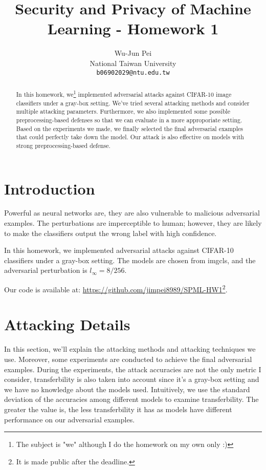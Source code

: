 \documentclass{article}
\title{Security and Privacy of Machine Learning - Homework 1}
\author{
  Wu-Jun Pei\\
  National Taiwan University\\
  \texttt{b06902029@ntu.edu.tw} \\
}
\begin{document}
\maketitle

\begin{abstract}
  In this homework, we\footnote{The subject is "we" although I do the homework on my own only :)} implemented adversarial attacks against CIFAR-10 image classifiers under a gray-box setting. We've tried several attacking methods and consider multiple attacking parameters. Furthermore, we also implemented some possible preprocessing-based defenses so that we can evaluate in a more approporiate setting. Based on the experiments we made, we finally selected the final adversarial examples that could perfectly take down the model. Our attack is also effective on models with strong preprocessing-based defense.
\end{abstract}

\section{Introduction}
Powerful as neural networks are, they are also vulnerable to malicious adversarial examples. The perturbations are imperceptible to human; however, they are likely to make the classifiers output the wrong label with high confidence.

In this homework, we implemented adversarial attacks against CIFAR-10 classifiers under a gray-box
setting. The models are chosen from imgcls\cite{imgcls}, and the adversarial perturbation is $l_{\infty} = 8 / 256$.

Our code is available at: \url{https://github.com/jimpei8989/SPML-HW1}\footnote{It is made public after the deadline.}.

\section{Attacking Details}
In this section, we'll explain the attacking methods and attacking techniques we use. Moreover, some experiments are conducted to achieve the final adversarial examples. During the experiments, the attack accuracies are not the only metric I consider, transferbility is also taken into account since it's a gray-box setting and we have no knowledge about the models used. Intuitively, we use the standard deviation of the accuracies among different models to examine transferbility. The greater the value is, the less transferbility it has as models have different performance on our adversarial examples.
\end{document}
